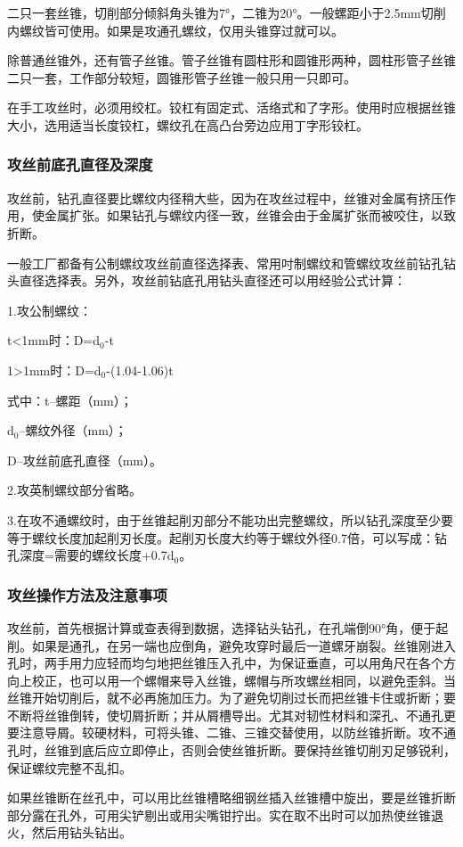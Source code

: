 \documentclass{ctexbook}
\begin{document}
二只一套丝锥，切削部分倾斜角头锥为7°，二锥为20°。一般螺距小于2.5mm切削内螺纹皆可使用。如果是攻通孔螺纹，仅用头锥穿过就可以。

除普通丝锥外，还有管子丝锥。管子丝锥有圆柱形和圆锥形两种，圆柱形管子丝锥二只一套，工作部分较短，圆锥形管子丝锥一般只用一只即可。

在手工攻丝时，必须用绞杠。铰杠有固定式、活络式和了字形。使用时应根据丝锥大小，选用适当长度铰杠，螺纹孔在高凸台旁边应用丁字形铰杠。
\subsubsection{攻丝前底孔直径及深度}
攻丝前，钻孔直径要比螺纹内径稍大些，因为在攻丝过程中，丝锥对金属有挤压作用，使金属扩张。如果钻孔与螺纹内径一致，丝锥会由于金属扩张而被咬住，以致折断。

一般工厂都备有公制螺纹攻丝前直径选择表、常用吋制螺纹和管螺纹攻丝前钻孔钻头直径选择表。另外，攻丝前钻底孔用钻头直径还可以用经验公式计算：

1.攻公制螺纹：

t<1mm时：D=d$_0$-t

1>1mm时：D=d$_0$-(1.04-1.06)t

式中：t--螺距（mm）；

d$_0$--螺纹外径（mm）；

D--攻丝前底孔直径（mm）。

2.攻英制螺纹部分省略。

3.在攻不通螺纹时，由于丝锥起削刃部分不能功出完整螺纹，所以钻孔深度至少要等于螺纹长度加起削刃长度。起削刃长度大约等于螺纹外径0.7倍，可以写成：钻孔深度=需要的螺纹长度+0.7d$_0$。
\subsubsection{攻丝操作方法及注意事项}
攻丝前，首先根据计算或查表得到数据，选择钻头钻孔，在孔端倒90°角，便于起削。如果是通孔，在另一端也应倒角，避免攻穿时最后一道螺牙崩裂。丝锥刚进入孔时，两手用力应轻而均匀地把丝锥压入孔中，为保证垂直，可以用角尺在各个方向上校正，也可以用一个螺帽来导入丝锥，螺帽与所攻螺丝相同，以避免歪斜。当丝锥开始切削后，就不必再施加压力。为了避免切削过长而把丝锥卡住或折断；要不断将丝锥倒转，使切屑折断；并从屑槽导出。尤其对韧性材料和深孔、不通孔更要注意导屑。较硬材料，可将头锥、二锥、三锥交替使用，以防丝锥折断。攻不通孔时，丝锥到底后应立即停止，否则会使丝锥折断。要保持丝锥切削刃足够锐利，保证螺纹完整不乱扣。

如果丝锥断在丝孔中，可以用比丝锥槽略细钢丝插入丝锥槽中旋出，要是丝锥折断部分露在孔外，可用尖铲剔出或用尖嘴钳拧出。实在取不出时可以加热使丝锥退火，然后用钻头钻出。
\end{document}
